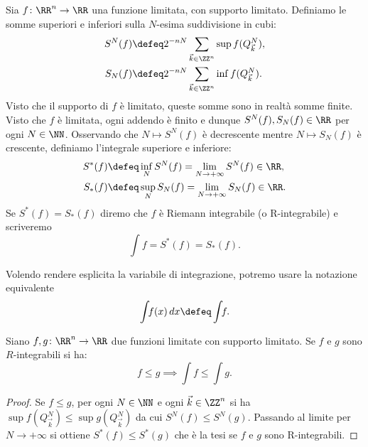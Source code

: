 \begin{definition}
  \label{def:integrale_riemann}
Sia $f\colon \RR^n \to \RR$ una funzione limitata, 
con supporto limitato.
Definiamo le somme superiori e inferiori sulla $N$-esima suddivisione in cubi:
\begin{align*}
    S^N(f) &\defeq 2^{-nN}\sum_{\vec k\in \ZZ^n} \sup f(Q^N_{\vec k}), \\
    S_N(f) &\defeq 2^{-nN}\sum_{\vec k\in \ZZ^n} \inf f(Q^N_{\vec k}).
\end{align*}
Visto che il supporto di $f$ è limitato, queste somme sono in realtà 
somme finite. Visto che $f$ è limitata, ogni addendo è finito e dunque 
$S^N(f), S_N(f) \in \RR$ per ogni $N\in \NN$.
Osservando che $N\mapsto S^N(f)$ è decrescente 
mentre $N\mapsto S_N(f)$ è crescente, definiamo
l'integrale superiore e inferiore:
\begin{align*}
    S^*(f) &\defeq \inf_N S^N(f) = \lim_{N\to +\infty} S^N(f) \in \RR, \\
    S_*(f) &\defeq \sup_N S_N(f) = \lim_{N\to +\infty} S_N(f) \in \RR.
\end{align*}
Se $S^*(f)=S_*(f)$ diremo che $f$ è Riemann integrabile (o R-integrabile)
e scriveremo
\[
  \int\!\! f = S^*(f) = S_*(f).
\]

Volendo rendere esplicita la variabile di integrazione, potremo
usare la notazione equivalente
\[
  \int\!\! f(x)\, dx \defeq \int\!\! f.
\]
\end{definition}

\begin{theorem}
Siano $f,g\colon \RR^n\to\RR$ due funzioni limitate con supporto limitato.
Se $f$ e $g$ sono $R$-integrabili si ha:
\[
  f \le g \implies \int\!\! f \le \int\!\! g.
\]
\end{theorem}
%
\begin{proof}
Se $f\le g$, per ogni $N\in \NN$ e ogni $\vec k \in \ZZ^n$ si ha 
$\sup f(Q^N_{\vec k}) \le \sup g(Q^N_{\vec k})$
da cui 
$S^N(f) \le S^N(g)$.
Passando al limite per $N\to +\infty$ si ottiene
$S^*(f) \le S^*(g)$
che è la tesi se $f$ e $g$ sono R-integrabili.
\end{proof}

